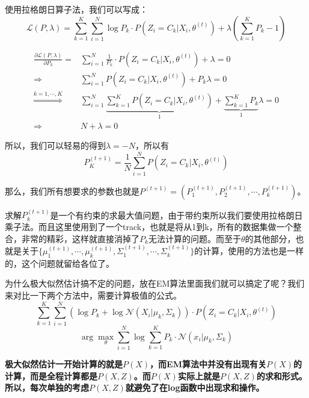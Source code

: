 \documentclass[a4paper]{article}
\begin{document}
使用拉格朗日算子法，我们可以写成：
\begin{equation}
    \mathcal{L}(P,\lambda) = \sum_{k=1}^K \sum_{i=1}^N  \log P_{k} \cdot P(Z_i = C_k|X_i,\theta^{(t)}) + \lambda(\sum_{k=1}^K P_k - 1)
\end{equation}

\begin{equation}
    \begin{split}
        \frac{\partial \mathcal{L}(P,\lambda)}{\partial P_k} = & \sum_{i=1}^N \frac{1}{P_k} \cdot P(Z_i = C_k|X_i,\theta^{(t)}) + \lambda = 0  \\
        \Rightarrow & \sum_{i=1}^N P(Z_i = C_k|X_i,\theta^{(t)}) + P_k \lambda = 0 \\
        \stackrel{k = 1,\cdots,K}{\Longrightarrow} & \sum_{i=1}^N\underbrace{\sum_{k=1}^K P(Z_i = C_k|X_i,\theta^{(t)})}_{1} + \underbrace{\sum_{k=1}^K P_k}_{1} \lambda = 0 \\
        \Rightarrow & N+\lambda = 0 
    \end{split}
\end{equation}

所以，我们可以轻易的得到$\lambda = -N$，所以有
\begin{equation}
    P_K^{(t+1)} = \frac{1}{N} \sum_{i=1}^N P(Z_i = C_k | X_i,\theta^{(t)})
\end{equation}

那么，我们所有想要求的参数也就是$P^{(t+1)} = (P_1^{(t+1)},P_2^{(t+1)},\cdots,P_k^{(t+1)})$。

求解$P_k^{(t+1)}$是一个有约束的求最大值问题，由于带约束所以我们要使用拉格朗日乘子法。而且这里使用到了一个track，也就是将从1到k，所有的数据集做一个整合，非常的精彩，这样就直接消掉了$P_k$无法计算的问题。而至于$\theta$的其他部分，也就是关于$\{ \mu_1^{(t+1)}, \cdots, \mu_k^{(t+1)},\Sigma_1^{(t+1)},\cdots,\Sigma_k^{(t+1)} \}$的计算，使用的方法也是一样的，这个问题就留给各位了。

为什么极大似然估计搞不定的问题，放在EM算法里面我们就可以搞定了呢？我们来对比一下两个方法中，需要计算极值的公式。
\begin{equation}
    \sum_{k=1}^K \sum_{i=1}^N \left( \log P_{k} + \log  \mathcal{N}(X_i|\mu_{k},\Sigma_{k}) \right) \cdot P(Z_i = C_k|X_i,\theta^{(t)})
\end{equation}
\begin{equation}
    \arg\max_{\theta}  \sum_{i=1}^N  \log \sum_{k=1}^K P_k \cdot \mathcal{N}(x_i|\mu_k,\Sigma_k)
\end{equation}


\textbf{极大似然估计一开始计算的就是$P(X)$，而EM算法中并没有出现有关$P(X)$的计算，而是全程计算都是$P(X,Z)$。而$P(X)$实际上就是$P(X,Z)$的求和形式。所以，每次单独的考虑$P(X,Z)$就避免了在log函数中出现求和操作。}
\end{document}
